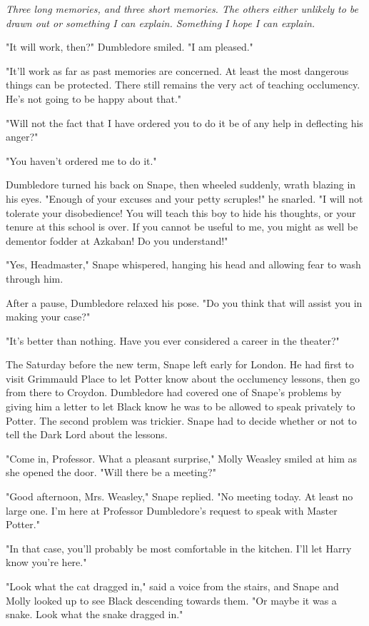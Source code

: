 \emph{Three long memories, and three short memories. The others either unlikely to be drawn out or something I can explain. Something I hope I can explain.}

\sbreak

"It will work, then?" Dumbledore smiled. "I am pleased."

"It'll work as far as past memories are concerned. At least the most dangerous things can be protected. There still remains the very act of teaching occlumency. He's not going to be happy about that."

"Will not the fact that I have ordered you to do it be of any help in deflecting his anger?"

"You haven't ordered me to do it."

Dumbledore turned his back on Snape, then wheeled suddenly, wrath blazing in his eyes. "Enough of your excuses and your petty scruples!" he snarled. "I will not tolerate your disobedience! You will teach this boy to hide his thoughts, or your tenure at this school is over. If you cannot be useful to me, you might as well be dementor fodder at Azkaban! Do you understand!"

"Yes, Headmaster," Snape whispered, hanging his head and allowing fear to wash through him.

After a pause, Dumbledore relaxed his pose. "Do you think that will assist you in making your case?"

"It's better than nothing. Have you ever considered a career in the theater?"

The Saturday before the new term, Snape left early for London. He had first to visit Grimmauld Place to let Potter know about the occlumency lessons, then go from there to Croydon. Dumbledore had covered one of Snape's problems by giving him a letter to let Black know he was to be allowed to speak privately to Potter. The second problem was trickier. Snape had to decide whether or not to tell the Dark Lord about the lessons.

"Come in, Professor. What a pleasant surprise," Molly Weasley smiled at him as she opened the door. "Will there be a meeting?"

"Good afternoon, Mrs. Weasley," Snape replied. "No meeting today. At least no large one. I'm here at Professor Dumbledore's request to speak with Master Potter."

"In that case, you'll probably be most comfortable in the kitchen. I'll let Harry know you're here."

"Look what the cat dragged in," said a voice from the stairs, and Snape and Molly looked up to see Black descending towards them. "Or maybe it was a snake. Look what the snake dragged in."

